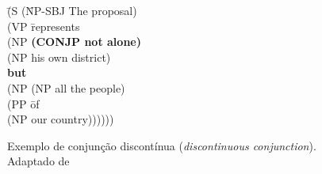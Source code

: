 \begin{figure}[!h]
    \centering
    \begin{minipage}{10cm}
        \begin{tabbing}
            \=(S (\=NP-SBJ The proposal)\+\\
                \>(VP \=represents\+\\
                    \>(NP \=\textbf{(CONJP not alone)}\+\\
                    \>(NP his own district)\\
                    \>\textbf{but}\\
                    \>(NP (NP all the people)\\
                    \>(PP \=of\\
                        \>(NP our country))))))\\
        \end{tabbing}
    \end{minipage}
    \caption[Exemplo de conjunção discontínua]{Exemplo de conjunção discontínua (\textit{discontinuous conjunction}). Adaptado de }
    \label{fig:ptb_conj_exe_3}
\end{figure}